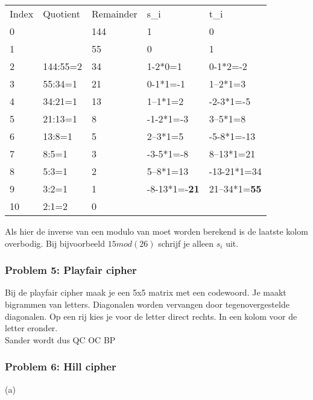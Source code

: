 \documentclass{uva-inf-article}
\begin{document}
\begin{table}
    \centering
    \begin{tabular}{lllll}
    Index & Quotient & Remainder & s\_i                 & t\_i                  \\
    0     &          & 144       & 1                    & 0                     \\
    1     &          & 55        & 0                    & 1                     \\
    2     & 144:55=2 & 34        & 1-2*0=1              & 0-1*2=-2              \\
    3     & 55:34=1  & 21        & 0-1*1=-1             & 1--2*1=3              \\
    4     & 34:21=1  & 13        & 1--1*1=2             & -2-3*1=-5             \\
    5     & 21:13=1  & 8         & -1-2*1=-3            & 3--5*1=8              \\
    6     & 13:8=1   & 5         & 2--3*1=5             & -5-8*1=-13            \\
    7     & 8:5=1    & 3         & -3-5*1=-8            & 8--13*1=21            \\
    8     & 5:3=1    & 2         & 5--8*1=13            & -13-21*1=34           \\
    9     & 3:2=1    & 1         & -8-13*1=-\textbf{21} & 21--34*1=\textbf{55}  \\
    10    & 2:1=2    & 0         &                      &                      
    \end{tabular}
\end{table}

Als hier de inverse van een modulo van moet worden berekend is de laatste kolom
overbodig. Bij bijvoorbeeld $15 mod(26)$ schrijf je alleen $s_{i}$ uit.

\subsubsection{Problem 5: Playfair cipher}
Bij de playfair cipher maak je een 5x5 matrix met een codewoord. Je maakt
bigrammen van letters. Diagonalen worden vervangen door tegenovergestelde
diagonalen. Op een rij kies je voor de letter direct rechts. In een kolom voor
de letter eronder.\\
Sander wordt dus QC OC BP

\subsubsection{Problem 6: Hill cipher}
(a)
\end{document}
